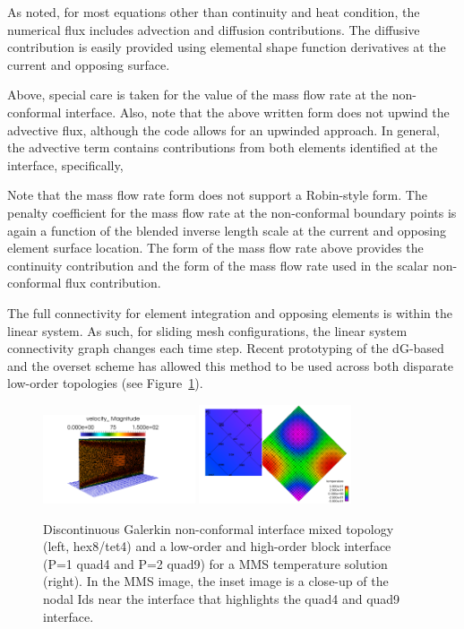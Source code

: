 As noted, for most equations other than continuity and heat condition, the numerical flux includes advection and 
diffusion contributions. The diffusive contribution is easily provided using elemental shape function derivatives 
at the current and opposing surface. 

Above, special care is taken for the value of the mass flow rate at the non-conformal interface. Also,
note that the above written form does not upwind the advective flux, although the code allows for an upwinded 
approach. In general, the advective term contains contributions from both elements identified at the interface, 
specifically,

Note that the mass flow rate form does not support a Robin-style form. The penalty coefficient for the mass 
flow rate at the non-conformal boundary points is again a function of the 
blended inverse length scale at the current and opposing element surface location. The form of the mass flow 
rate above provides the continuity contribution and the form of the mass flow rate used in the scalar non-conformal
flux contribution.

The full connectivity for element integration and opposing elements is within the linear 
system. As such, for sliding mesh configurations, the linear system connectivity graph changes each time step. Recent prototyping of 
the dG-based and the overset scheme has allowed this method to be used across both disparate low-order 
topologies (see Figure~\ref{dgMixMatch}).

\begin{figure}[h!tp]
\centering
\includegraphics[clip,width=0.4\textwidth]{images/dgHex8Tet4Duct.png}
\includegraphics[clip,width=0.4\textwidth]{images/dgQuad4Quad9MMS.png}
\caption{Discontinuous Galerkin non-conformal interface mixed topology (left, hex8/tet4) and a low-order and high-order block interface 
(P=1 quad4 and P=2 quad9) for a MMS temperature solution (right). In the MMS image, the inset image is a close-up of the nodal 
Ids near the interface that highlights the quad4 and quad9 interface.}
\label{dgMixMatch}
\end{figure}
